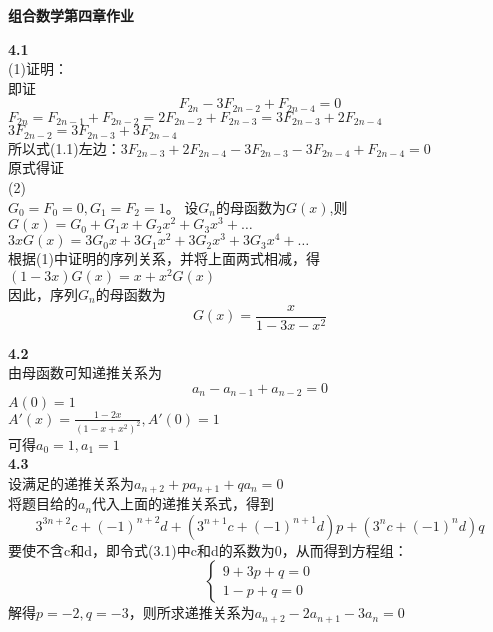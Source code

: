 \documentclass[a4paper,12pt]{article}
\begin{document}
	
	\begin{center}
		{\large \textbf{组合数学第四章作业}}\\
	\end{center}
	
	\noindent
	\textbf{4.1}\\
	(1)证明：\\
	即证\[F_{2n}-3F_{2n-2}+F_{2n-4}=0 \tag{1.1} \]
	$F_{2n}=F_{2n-1}+F_{2n-2}=2F_{2n-2}+F_{2n-3}=3F_{2n-3}+2F_{2n-4}$\\
	$3F_{2n-2}=3F_{2n-3}+3F_{2n-4}$\\
	所以式(1.1)左边：$3F_{2n-3}+2F_{2n-4}-3F_{2n-3}-3F_{2n-4}+F_{2n-4}=0$\\
	原式得证\\
	(2)\\
	$G_0=F_0=0,G_1=F_2=1$。
	设$G_{n}$的母函数为$G(x)$,则\\
	$G(x)=G_{0}+G_{1}x+G_{2}x^{2}+G_{3}x^{3}+\dots $\\
	$3xG(x)=3G_{0}x+3G_{1}x^{2}+3G_{2}x^{3}+3G_{3}x^{4}+\dots $\\
	根据(1)中证明的序列关系，并将上面两式相减，得\\
	$(1-3x)G(x)=x+x^{2}G(x)$\\
	因此，序列$G_{n}$的母函数为\[
	G(x)=\frac{x}{1-3x-x^2}
	\]
	
	\noindent
	\textbf{4.2}\\
	由母函数可知递推关系为\[
		a_{n}-a_{n-1}+a_{n-2}=0
	\]
	$A(0)=1$\\
	$A'(x)=\frac{1-2x}{(1-x+x^2)^2},A'(0)=1$\\
	可得$a_{0}=1,a_{1}=1$
	\\
	
	\noindent
	\textbf{4.3}\\
	设满足的递推关系为$a_{n+2}+pa_{n+1}+qa_{n}=0$\\
	将题目给的$a_{n}$代入上面的递推关系式，得到\[
	3^{3n+2}c+(-1)^{n+2}d+(3^{n+1}c+(-1)^{n+1}d)p+(3^{n}c+(-1)^{n}d)q \tag{3.1}
	\]
	要使不含c和d，即令式(3.1)中c和d的系数为0，从而得到方程组：\\
	$$
	\begin{cases}
		9+3p+q=0\\
		1-p+q=0
	\end{cases}
	$$
	解得$p=-2,q=-3$，则所求递推关系为$a_{n+2}-2a_{n+1}-3a_{n}=0$
	\\
\end{document}
